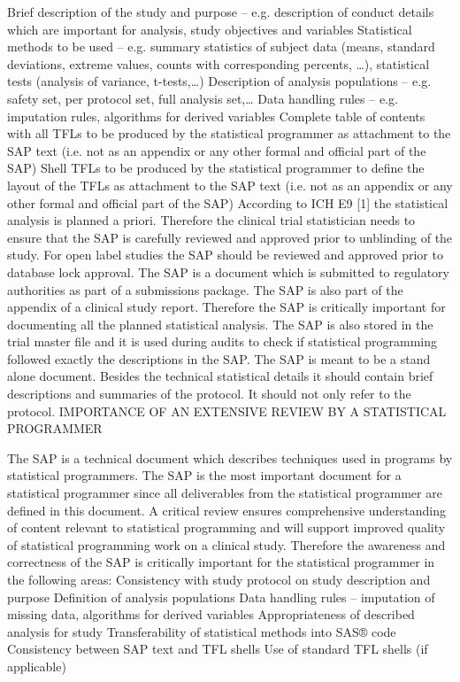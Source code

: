 Brief description of the study and purpose – e.g. description of conduct details which are important for analysis, study objectives and variables
Statistical methods to be used – e.g. summary statistics of subject data (means, standard deviations, extreme values, counts with corresponding percents, …), statistical tests (analysis of variance, t-tests,…)
Description of analysis populations – e.g. safety set, per protocol set, full analysis set,…
Data handling rules – e.g. imputation rules, algorithms for derived variables
Complete table of contents with all TFLs to be produced by the statistical programmer as attachment to the SAP text (i.e. not as an appendix or any other formal and official part of the SAP)
Shell TFLs to be produced by the statistical programmer to define the layout of the TFLs as attachment to the SAP text (i.e. not as an appendix or any other formal and official part of the SAP)
According to ICH E9 [1] the statistical analysis is planned a priori. Therefore the clinical trial statistician needs to ensure that the SAP is carefully reviewed and approved prior to unblinding of the study. For open label studies the SAP should be reviewed and approved prior to database lock approval.
The SAP is a document which is submitted to regulatory authorities as part of a submissions package. The SAP is also part of the appendix of a clinical study report. Therefore the SAP is critically important for documenting all the planned statistical analysis. The SAP is also stored in the trial master file and it is used during audits to check if statistical programming followed exactly the descriptions in the SAP. The SAP is meant to be a stand alone document. Besides the technical statistical details it should contain brief descriptions and summaries of the protocol. It should not only refer to the protocol.
IMPORTANCE OF AN EXTENSIVE REVIEW BY A STATISTICAL PROGRAMMER

The SAP is a technical document which describes techniques used in programs by statistical programmers. The SAP is the most important document for a statistical programmer since all deliverables from the statistical programmer are defined in this document. A critical review ensures comprehensive understanding of content relevant to statistical programming and will support improved quality of statistical programming work on a clinical study. Therefore the awareness and correctness of the SAP is critically important for the statistical programmer in the following areas:
Consistency with study protocol on study description and purpose
Definition of analysis populations
Data handling rules – imputation of missing data, algorithms for derived variables
Appropriateness of described analysis for study
Transferability of statistical methods into SAS® code
Consistency between SAP text and TFL shells
Use of standard TFL shells (if applicable)

